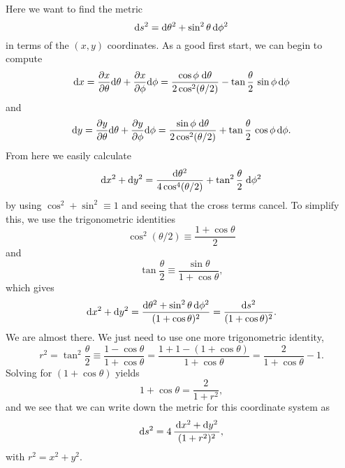 \documentclass[11pt,a4paper, 
swedish, english %
]{article}
\begin{document}
Here we want to find the metric 
\begin{equation}
\mathrm{d}{s}^2=\mathrm{d}\theta^2+\sin^2\theta\,\mathrm{d}\phi^2
\end{equation}
in terms of the $(x,y)$ coordinates. As a good first start, we can
begin to compute
\begin{equation}
\mathrm{d}{x}=\pdv{x}{\theta}\mathrm{d}\theta+\pdv{x}{\phi}\mathrm{d}\phi
=\frac{\cos\phi\;\mathrm{d}\theta}{2\cos^2(\theta/2)}
-\tan\frac{\theta}{2}\,\sin\phi\,\mathrm{d}\phi
\end{equation}
and
\begin{equation}
\mathrm{d}{y}=\pdv{y}{\theta}\mathrm{d}\theta+\pdv{y}{\phi}\mathrm{d}\phi
=\frac{\sin\phi\;\mathrm{d}\theta}{2\cos^2(\theta/2)}
+\tan\frac{\theta}{2}\,\cos\phi\,\mathrm{d}\phi.
\end{equation}
From here we easily calculate
\begin{equation}
\mathrm{d}{x}^2+\mathrm{d}{y}^2=
\frac{\mathrm{d}\theta^2}{4\cos^4(\theta/2)} 
+\tan^2\frac{\theta}{2}\;\mathrm{d}\phi^2
\end{equation}
by using $\cos^2+\sin^2\equiv1$ and seeing that the cross
terms cancel. To simplify this, we use the trigonometric identities
\begin{equation}
\cos^2(\theta/2)\equiv\frac{1+\cos\theta}{2}
\end{equation}
and
\begin{equation}
\tan\frac{\theta}{2}\equiv \frac{\sin\theta}{1+\cos\theta},
\end{equation}
which gives
\begin{equation}
\mathrm{d}{x}^2+\mathrm{d}{y}^2
=\frac{\mathrm{d}\theta^2+\sin^2\theta\,\mathrm{d}\phi^2}{(1+\cos\theta)^2} 
=\frac{\mathrm{d}{s}^2}{(1+\cos\theta)^2}.
\end{equation}
We are almost there. We just need to use one more trigonometric
identity,
\begin{equation}
r^2=\tan^2\frac{\theta}{2}\equiv
\frac{1-\cos\theta}{1+\cos\theta}
=\frac{1+1-(1+\cos\theta)}{1+\cos\theta}
=\frac{2}{1+\cos\theta}-1.
\end{equation}
Solving for $(1+\cos\theta)$ yields
\begin{equation}
1+\cos\theta=\frac{2}{1+r^2},
\end{equation}
and we see that we can write down the metric for this coordinate
system as
\begin{equation}
\mathrm{d}{s}^2=4\,\frac{\,\mathrm{d}{x}^2+\mathrm{d}{y}^2\,}{(1+r^2)^2},
\end{equation}
with $r^2=x^2+y^2$.

\end{document}
